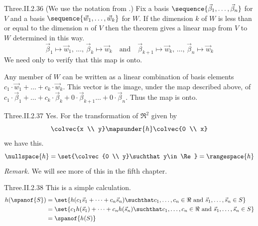 \begin{ans}{Three.II.2.36}
      (We use the notation from .)
      Fix a basis $\sequence{\vec{\beta}_1,\dots,\vec{\beta}_n}$ for $V$
      and a basis
      $\sequence{\vec{w}_1,\ldots,\vec{w}_k}$ for $W$.
      If the dimension $k$ of $W$ is less than or equal to the dimension $n$
      of $V$
      then the theorem gives a linear map from $V$ to $W$
      determined in this way.
      \begin{equation*}
        \vec{\beta}_1\mapsto\vec{w}_1,\,\dots,\,\vec{\beta}_k\mapsto\vec{w}_k
        \quad\text{and}\quad
        \vec{\beta}_{k+1}\mapsto\vec{w}_k,
           \,\dots,\,\vec{\beta}_n\mapsto\vec{w}_k
      \end{equation*}
      We need only to verify that this map is onto.

      Any member of $W$ can be written as a linear combination of
      basis elements
      $c_1\cdot \vec{w}_1+\dots+c_k\cdot \vec{w}_k$.
      This vector is the image, under the map described above, of
      $c_1\cdot \vec{\beta}_1+\dots+c_k\cdot \vec{\beta}_k
      +0\cdot \vec{\beta}_{k+1}\dots+0\cdot \vec{\beta}_n$.
      Thus the map is onto.
    
\end{ans}
\begin{ans}{Three.II.2.37}
      Yes.
      For the transformation of \( \Re^2 \) given by
      \begin{equation*}
        \colvec{x \\ y}\mapsunder{h}\colvec{0 \\ x}
      \end{equation*}
      we have this.
      \begin{equation*}
        \nullspace{h}=\set{\colvec{0 \\ y}\suchthat y\in\Re}
        =\rangespace{h}
      \end{equation*}
      \textit{Remark.}
      We will see more of this in the fifth chapter.
    
\end{ans}
\begin{ans}{Three.II.2.38}
        This is a simple calculation.
          \begin{align*}
            h(\spanof{S})
            &=\set{h(c_1\vec{s}_1+\dots+c_n\vec{s}_n)
                 \suchthat \text{\( c_1,\dots,c_n\in\Re \)
                                 and \( \vec{s}_1,\dots,\vec{s}_n\in S \)} } \\
            &=\set{c_1h(\vec{s}_1)+\dots+c_nh(\vec{s}_n)
                 \suchthat \text{\( c_1,\dots,c_n\in\Re \)
                                 and \( \vec{s}_1,\dots,\vec{s}_n\in S \)} } \\
            &=\spanof{h(S)}
          \end{align*}
     
\end{ans}
